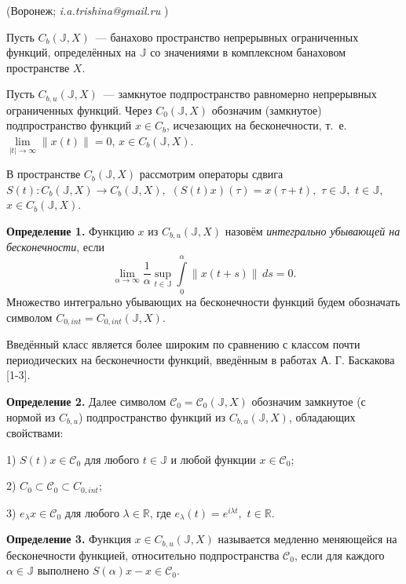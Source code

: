 

\vzmsinfo(Воронеж; {\it i.a.trishina@gmail.ru} )



Пусть $C_b(\mathbb{J},X)$~--- банахово пространство непрерывных ограниченных функций,
определённых на $\mathbb{J}$ со значениями в комплексном банаховом пространстве $X$.

Пусть $C_{b,u}(\mathbb{J},X)$~--- замкнутое подпространство равномерно непрерывных ограниченных функций. Через $C_0(\mathbb{J},X)$ обозначим (замкнутое) подпространство функций $x\in C_b$,
 исчезающих на бесконечности, т.~е. $\lim\limits_{|t|\rightarrow\infty}\|x(t)\|=0$, $x\in C_b(\mathbb{J},X)$.

В пространстве $C_{b}(\mathbb{J},X)$ рассмотрим операторы сдвига $S(t):C_{b}(\mathbb{J},X)\rightarrow C_{b}(\mathbb{J},X),$ $(S(t)x)(\tau) = x(\tau + t),$ $\tau\in\mathbb{J},$ $t\in\mathbb{J},$ $x\in C_{b}(\mathbb{J},X)$.


\textbf{Определение 1.} Функцию  $x$ из $C_{b,u}(\mathbb{J},X)$ назовём \emph{интегрально убывающей на бесконечности},
если $$\lim\limits_{\alpha\rightarrow\infty}\frac{1}{\alpha}\sup\limits_{t\in\mathbb{J}}\int\limits_0^{\alpha}\|x(t+s)\|\,ds=0.$$
Множество интегрально убывающих на бесконечности фун\-к\-ций будем обозначать символом $C_{0,int}=C_{0,int}(\mathbb{J},X)$.

Введённый класс является более широким по сравнению с
классом почти периодических на бесконечности функций, введённым в работах А. Г.
Баскакова [1-3].

\textbf{Определение 2.} Далее символом $\mathcal{C}_0=\mathcal{C}_0(\mathbb{J},X)$ обозначим замкнутое (с нормой из $C_{b,u}$) подпространство функций из $C_{b,u}(\mathbb{J},X)$, обладающих свойствами:

1) $S(t)x\in \mathcal{C}_0$ для любого $t\in\mathbb{J}$ и любой функции $x\in\mathcal{C}_0$;

2) $C_0 \subset \mathcal{C}_0 \subset C_{0,int}$;

3) $e_{\lambda}x \in \mathcal{C}_0$ для любого $\lambda\in\mathbb{R}$, где $e_{\lambda}(t)=e^{i\lambda t},$ $t\in\mathbb{R}$.


\textbf{Определение 3.}
Функция $x\in C_{b,u}(\mathbb{J},X)$ называется медленно
меняющейся на бесконечности функцией, относительно подпространства $\mathcal{C}_0$, если для каждого $\alpha \in \mathbb{J}$ выполнено $S(\alpha)x-x\in \mathcal{C}_{0}$.



